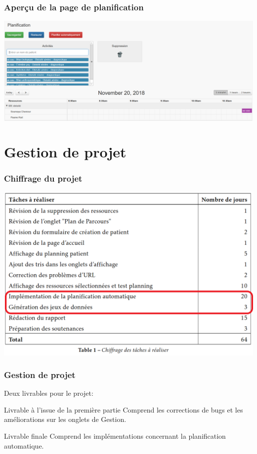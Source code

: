 \documentclass{beamer}
\begin{document}
\begin{frame}
\frametitle{Aperçu de la page de planification}

\begin{center}
	\includegraphics[scale=0.3]{images/bouton_plan_auto}
\end{center}

\end{frame}

\section[Gestion de projet]{Gestion de projet}

\begin{frame}
\frametitle{Chiffrage du projet}

\begin{center}
	\includegraphics[scale=0.375]{images/chiffrage}
\end{center}

\end{frame}

\begin{frame}
\frametitle{Gestion de projet}

Deux livrables pour le projet:

\bigbreak

\begin{block}{Livrable à l'issue de la première partie}
	Comprend les corrections de bugs et les améliorations sur les onglets de Gestion.
\end{block}

\begin{block}{Livrable finale}
	Comprend les implémentations concernant la planification automatique.
\end{block}

\end{frame}
\end{document}
